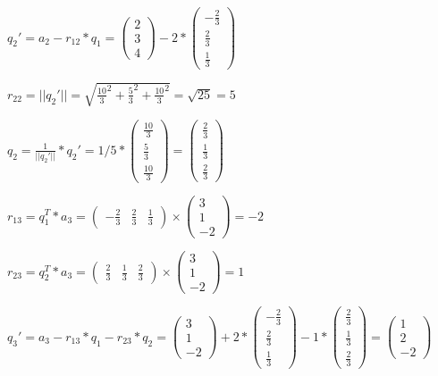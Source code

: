 \documentclass[10pt,a4paper]{article}
\begin{document}
$q_2' = a_2-r_{12}*q_1 = \begin{pmatrix}
        2 \\
        3 \\
        4
    \end{pmatrix} - 2*\begin{pmatrix}
        -\frac{2}{3} \\
        \frac{2}{3}  \\
        \frac{1}{3}
    \end{pmatrix}$

$r_{22}=||q_2'||=\sqrt{\frac{10}{3}^2 + \frac{5}{3}^2 + \frac{10}{3}^2}=\sqrt{25}=5$

$q_2 = \frac{1}{||q_2'||} * q_2' = 1/5 * \begin{pmatrix}
        \frac{10}{3} \\
        \frac{5}{3}  \\
        \frac{10}{3}
    \end{pmatrix}=\begin{pmatrix}
        \frac{2}{3} \\
        \frac{1}{3} \\
        \frac{2}{3}
    \end{pmatrix}$

$r_{13} = q^T_1 * a_3 = \begin{pmatrix}
        -\frac{2}{3} & \frac{2}{3} & \frac{1}{3}
    \end{pmatrix} \times \begin{pmatrix}
        3 \\
        1 \\
        -2
    \end{pmatrix}=-2$

$r_{23} = q^T_2 * a_3 = \begin{pmatrix}
        \frac{2}{3} & \frac{1}{3} & \frac{2}{3}
    \end{pmatrix} \times \begin{pmatrix}
        3 \\
        1 \\
        -2
    \end{pmatrix}=1$

$q_3'=a_3-r_{13}*q_1-r_{23}*q_2=\begin{pmatrix}
        3 \\
        1 \\
        -2
    \end{pmatrix} + 2*\begin{pmatrix}
        -\frac{2}{3} \\
        \frac{2}{3} \\
        \frac{1}{3}
    \end{pmatrix} - 1*\begin{pmatrix}
        \frac{2}{3} \\
        \frac{1}{3} \\
        \frac{2}{3}
    \end{pmatrix}=\begin{pmatrix}
        1\\
        2\\
        -2
    \end{pmatrix}$
\end{document}
